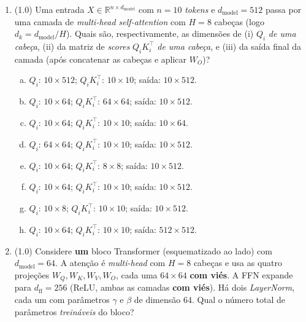\documentclass[11pt,a4paper]{article}
\begin{document}
\begin{enumerate}[1)]


\item (1.0) Uma entrada $X \in \mathbb{R}^{n \times d_{\text{model}}}$ com $n = 10$ \textit{tokens} e $d_{\text{model}} = 512$ passa por uma camada de \textit{multi-head self-attention} com $H = 8$ cabeças (logo $d_k = d_{\text{model}}/H$). Quais são, respectivamente, as dimensões de (i) $Q_i$ \emph{de uma cabeça}, (ii) da matriz de \textit{scores} $Q_i K_i^\top$ \emph{de uma cabeça}, e (iii) da saída final da camada (após concatenar as cabeças e aplicar $W_O$)?

\begin{enumerate}[a)]
    \item $Q_i$: $10 \times 512$; \quad $Q_i K_i^\top$: $10 \times 10$; \quad saída: $10 \times 512$.
    \item $Q_i$: $10 \times 64$; \quad $Q_i K_i^\top$: $64 \times 64$; \quad saída: $10 \times 512$.
    \item $Q_i$: $10 \times 64$; \quad $Q_i K_i^\top$: $10 \times 10$; \quad saída: $10 \times 64$.
    \item $Q_i$: $64 \times 64$; \quad $Q_i K_i^\top$: $10 \times 10$; \quad saída: $10 \times 512$.
    \item $Q_i$: $10 \times 64$; \quad $Q_i K_i^\top$: $8 \times 8$; \quad saída: $10 \times 512$.
    \item $Q_i$: $10 \times 64$; \quad $Q_i K_i^\top$: $10 \times 10$; \quad saída: $10 \times 512$.
    \item $Q_i$: $10 \times 8$; \quad $Q_i K_i^\top$: $10 \times 10$; \quad saída: $10 \times 512$.
    \item $Q_i$: $10 \times 64$; \quad $Q_i K_i^\top$: $10 \times 10$; \quad saída: $512 \times 512$.
\end{enumerate}

\pagebreak

\item (1.0) Considere \textbf{um} bloco Transformer (esquematizado ao lado) com $d_{\text{model}} = 64$. A atenção é \textit{multi-head} com $H = 8$ cabeças e usa as quatro projeções $W_Q, W_K, W_V, W_O$, cada uma $64 \times 64$ \textbf{com viés}. A FFN expande para $d_{\text{ff}} = 256$ (ReLU, ambas as camadas \textbf{com viés}). Há dois \textit{LayerNorm}, cada um com parâmetros $\gamma$ e $\beta$ de dimensão $64$. Qual o número total de parâmetros \emph{treináveis} do bloco?


\end{enumerate}
\end{document}
